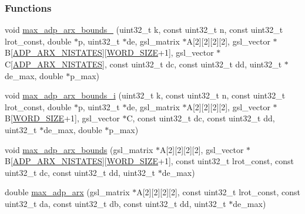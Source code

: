 \subsubsection*{\-Functions}
\begin{DoxyCompactItemize}
\item 
void \hyperlink{max-adp-arx_8hh_aca732635ed09b370e99cb05feb4c2765}{max\-\_\-adp\-\_\-arx\-\_\-bounds\-\_} (uint32\-\_\-t k, const uint32\-\_\-t n, const uint32\-\_\-t lrot\-\_\-const, double $\ast$p, uint32\-\_\-t $\ast$de, gsl\-\_\-matrix $\ast$\-A\mbox{[}2\mbox{]}\mbox{[}2\mbox{]}\mbox{[}2\mbox{]}\mbox{[}2\mbox{]}, gsl\-\_\-vector $\ast$\-B\mbox{[}\hyperlink{adp-arx_8hh_af9236f8d08a54b97ed2199271de979f6}{\-A\-D\-P\-\_\-\-A\-R\-X\-\_\-\-N\-I\-S\-T\-A\-T\-E\-S}\mbox{]}\mbox{[}\hyperlink{common_8hh_a92ed8507d1cd2331ad09275c5c4c1c89}{\-W\-O\-R\-D\-\_\-\-S\-I\-Z\-E}+1\mbox{]}, gsl\-\_\-vector $\ast$\-C\mbox{[}\hyperlink{adp-arx_8hh_af9236f8d08a54b97ed2199271de979f6}{\-A\-D\-P\-\_\-\-A\-R\-X\-\_\-\-N\-I\-S\-T\-A\-T\-E\-S}\mbox{]}, const uint32\-\_\-t dc, const uint32\-\_\-t dd, uint32\-\_\-t $\ast$de\-\_\-max, double $\ast$p\-\_\-max)
\item 
void \hyperlink{max-adp-arx_8hh_a0976a49270edcbdfae7c207c0b807a89}{max\-\_\-adp\-\_\-arx\-\_\-bounds\-\_\-i} (uint32\-\_\-t k, const uint32\-\_\-t n, const uint32\-\_\-t lrot\-\_\-const, double $\ast$p, uint32\-\_\-t $\ast$de, gsl\-\_\-matrix $\ast$\-A\mbox{[}2\mbox{]}\mbox{[}2\mbox{]}\mbox{[}2\mbox{]}\mbox{[}2\mbox{]}, gsl\-\_\-vector $\ast$\-B\mbox{[}\hyperlink{common_8hh_a92ed8507d1cd2331ad09275c5c4c1c89}{\-W\-O\-R\-D\-\_\-\-S\-I\-Z\-E}+1\mbox{]}, gsl\-\_\-vector $\ast$\-C, const uint32\-\_\-t dc, const uint32\-\_\-t dd, uint32\-\_\-t $\ast$de\-\_\-max, double $\ast$p\-\_\-max)
\item 
void \hyperlink{max-adp-arx_8hh_a33419708a7aa0ca45657294dcfd98d86}{max\-\_\-adp\-\_\-arx\-\_\-bounds} (gsl\-\_\-matrix $\ast$\-A\mbox{[}2\mbox{]}\mbox{[}2\mbox{]}\mbox{[}2\mbox{]}\mbox{[}2\mbox{]}, gsl\-\_\-vector $\ast$\-B\mbox{[}\hyperlink{adp-arx_8hh_af9236f8d08a54b97ed2199271de979f6}{\-A\-D\-P\-\_\-\-A\-R\-X\-\_\-\-N\-I\-S\-T\-A\-T\-E\-S}\mbox{]}\mbox{[}\hyperlink{common_8hh_a92ed8507d1cd2331ad09275c5c4c1c89}{\-W\-O\-R\-D\-\_\-\-S\-I\-Z\-E}+1\mbox{]}, const uint32\-\_\-t lrot\-\_\-const, const uint32\-\_\-t dc, const uint32\-\_\-t dd, uint32\-\_\-t $\ast$de\-\_\-max)
\item 
double \hyperlink{max-adp-arx_8hh_a661c329bf4379aac10838bd72310cebd}{max\-\_\-adp\-\_\-arx} (gsl\-\_\-matrix $\ast$\-A\mbox{[}2\mbox{]}\mbox{[}2\mbox{]}\mbox{[}2\mbox{]}\mbox{[}2\mbox{]}, const uint32\-\_\-t lrot\-\_\-const, const uint32\-\_\-t da, const uint32\-\_\-t db, const uint32\-\_\-t dd, uint32\-\_\-t $\ast$de\-\_\-max)

\end{DoxyCompactItemize}
